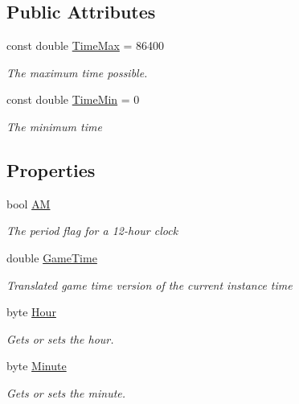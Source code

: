 \subsection*{Public Attributes}
\begin{DoxyCompactItemize}
\item 
const double \hyperlink{structOTA_1_1Command_1_1WorldTime_a0b4313f710d865ae9faf23e7ba3b6a95}{Time\+Max} = 86400
\begin{DoxyCompactList}\small\item\em The maximum time possible. \end{DoxyCompactList}\item 
const double \hyperlink{structOTA_1_1Command_1_1WorldTime_a9e4a84053d1c6c3760964fdbd19fc28c}{Time\+Min} = 0
\begin{DoxyCompactList}\small\item\em The minimum time \end{DoxyCompactList}\end{DoxyCompactItemize}
\subsection*{Properties}
\begin{DoxyCompactItemize}
\item 
bool \hyperlink{structOTA_1_1Command_1_1WorldTime_a73feb466eb3d31450be8df9849a6ff3f}{A\+M}
\begin{DoxyCompactList}\small\item\em The period flag for a 12-\/hour clock \end{DoxyCompactList}\item 
double \hyperlink{structOTA_1_1Command_1_1WorldTime_a42cec171058685931def95994647cf1f}{Game\+Time}
\begin{DoxyCompactList}\small\item\em Translated game time version of the current instance time \end{DoxyCompactList}\item 
byte \hyperlink{structOTA_1_1Command_1_1WorldTime_aa3de14e3a386da7f7f588a6e0185e0d0}{Hour}
\begin{DoxyCompactList}\small\item\em Gets or sets the hour. \end{DoxyCompactList}\item 
byte \hyperlink{structOTA_1_1Command_1_1WorldTime_a0cdef82fcabb2fea404ae99c50eec8ec}{Minute}
\begin{DoxyCompactList}\small\item\em Gets or sets the minute. \end{DoxyCompactList}\end{DoxyCompactItemize}



